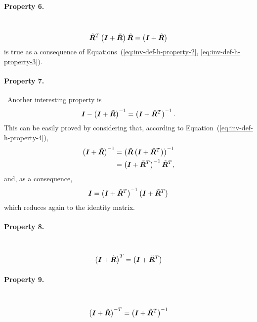 \documentclass[10pt,dvips,fleqn,subeqn]{report}
\newcommand{\T}[1]{\bm{#1}}
\begin{document}
\paragraph{Property 6.} \
\begin{equation}
	\tilde{\T{R}}^T \plbr{\T{I} + \tilde{\T{R}}} \tilde{\T{R}} = \plbr{\T{I} + \tilde{\T{R}}}
	\label{eq:inv-def-h-property-6}
\end{equation}
is true as a consequence
of Equations~(\ref{eq:inv-def-h-property-2}, \ref{eq:inv-def-h-property-3}).

\paragraph{Property 7.} \
Another interesting property is
\begin{equation}
	\T{I} - \plbr{\T{I} + \tilde{\T{R}}}^{-1} = \plbr{\T{I} + \tilde{\T{R}}^T}^{-1} .
	\label{eq:inv-def-h-property-7}
\end{equation}
This can be easily proved by considering that,
according to Equation~(\ref{eq:inv-def-h-property-4}),
\begin{align}
	\plbr{\T{I} + \tilde{\T{R}}}^{-1}
	&= \plbr{\tilde{\T{R}}\plbr{\T{I} + \tilde{\T{R}}^T}}^{-1} \nonumber \\
	&= \plbr{\T{I} + \tilde{\T{R}}^T}^{-1} \tilde{\T{R}}^T ,
\end{align}
and, as a consequence,
\begin{equation}
	\T{I} = \plbr{\T{I} + \tilde{\T{R}}^T}^{-1} \plbr{\T{I} + \tilde{\T{R}}^T}
\end{equation}
which reduces again to the identity matrix.

\paragraph{Property 8.} \
\begin{equation}
	\plbr{\T{I} + \tilde{\T{R}}}^T = \plbr{\T{I} + \tilde{\T{R}}^T}
	\label{eq:inv-def-h-property-8}
\end{equation}

\paragraph{Property 9.} \
\begin{equation}
	\plbr{\T{I} + \tilde{\T{R}}}^{-T} = \plbr{\T{I} + \tilde{\T{R}}^T}^{-1}
	\label{eq:inv-def-h-property-9}
\end{equation}
\end{document}
